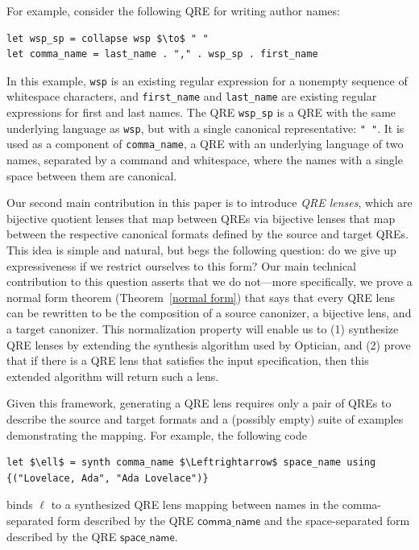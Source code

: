 \documentclass[acmsmall,review,anonymous]{acmart}
\newcommand{\codefont}[1]{\ensuremath{\mathsf{#1}}}
\begin{document}
For example, consider the following QRE for writing author
names:
%
\begin{lstlisting}
let wsp_sp = collapse wsp $\to$ " "
let comma_name = last_name . "," . wsp_sp . first_name
\end{lstlisting}
%
In this example, \lstinline{wsp} is an existing regular expression for a
nonempty sequence of whitespace characters, and \lstinline{first_name} and
\lstinline{last_name} are existing regular expressions for first and last names.
The QRE \lstinline{wsp_sp} is a QRE with the same underlying language as
\lstinline{wsp}, but with a single canonical representative: \lstinline{" "}.
It is used as a component of \lstinline{comma_name}, a QRE with an
underlying language of two names, separated by a command and whitespace, where
the names with a single space between them are canonical.

Our second main contribution in this paper is to introduce {\em QRE lenses},
which are bijective quotient lenses that map between QREs via bijective lenses
that map between the respective canonical formats defined by the source and
target QREs. This idea is simple and natural, but begs the following question:
do we give up expressiveness if we restrict ourselves to this form? Our main
technical contribution to this question asserts that we do not---more
specifically, we prove a normal form theorem (Theorem~\ref{normal form})
that says that every QRE lens can be rewritten to be the composition of a
source canonizer, a bijective lens, and a target canonizer. This normalization
property will enable us to (1) synthesize QRE lenses by extending the synthesis
algorithm used by Optician, and (2) prove that if there is a QRE lens that
satisfies the input specification, then this extended algorithm will return
such a lens.

Given this framework, generating a QRE lens requires only a pair of QREs to
describe the source and target formats and a (possibly empty) suite of examples
demonstrating the mapping.  For example, the following code

\begin{lstlisting}
let $\ell$ = synth comma_name $\Leftrightarrow$ space_name using {("Lovelace, Ada", "Ada Lovelace")}
\end{lstlisting}
binds $\ell$ to a synthesized QRE lens mapping between names in the
comma-separated form described by the QRE \codefont{comma\_name} and the
space-separated form described by the QRE \codefont{space\_name}. 
\end{document}
